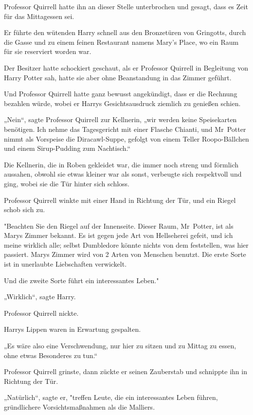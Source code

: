 {Professor Quirrell hatte ihn an dieser Stelle unterbrochen und gesagt, dass es Zeit für das Mittagessen sei.

Er führte den wütenden Harry schnell aus den Bronzetüren von Gringotts, durch die Gasse und zu einem feinen Restaurant namens Mary's Place, wo ein Raum für sie reserviert worden war.

Der Besitzer hatte schockiert geschaut, als er Professor Quirrell in Begleitung von Harry Potter sah, hatte sie aber ohne Beanstandung in das Zimmer geführt.

Und Professor Quirrell hatte ganz bewusst angekündigt, dass er die Rechnung bezahlen würde, wobei er Harrys Gesichtsausdruck ziemlich zu genießen schien.

„Nein“, sagte Professor Quirrell zur Kellnerin, „wir werden keine Speisekarten benötigen. Ich nehme das Tagesgericht mit einer Flasche Chianti, und Mr~Potter nimmt als Vorspeise die Diracawl-Suppe, gefolgt von einem Teller Roopo-Bällchen und einem Sirup-Pudding zum Nachtisch.“

Die Kellnerin, die in Roben gekleidet war, die immer noch streng und förmlich aussahen, obwohl sie etwas kleiner war als sonst, verbeugte sich respektvoll und ging, wobei sie die Tür hinter sich schloss.

Professor Quirrell winkte mit einer Hand in Richtung der Tür, und ein Riegel schob sich zu.

"Beachten Sie den Riegel auf der Innenseite. Dieser Raum, Mr~Potter, ist als Marys Zimmer bekannt. Es ist gegen jede Art von Hellseherei gefeit, und ich meine wirklich alle; selbst Dumbledore könnte nichts von dem feststellen, was hier passiert. Marys Zimmer wird von 2 Arten von Menschen benutzt. Die erste Sorte ist in unerlaubte Liebschaften verwickelt.

Und die zweite Sorte führt ein interessantes Leben."

„Wirklich“, sagte Harry.

Professor Quirrell nickte.

Harrys Lippen waren in Erwartung gespalten.

„Es wäre also eine Verschwendung, nur hier zu sitzen und zu Mittag zu essen, ohne etwas Besonderes zu tun.“

Professor Quirrell grinste, dann zückte er seinen Zauberstab und schnippte ihn in Richtung der Tür.

„Natürlich“, sagte er, "treffen Leute, die ein interessantes Leben führen, gründlichere Vorsichtsmaßnahmen als die Malliers.

}
